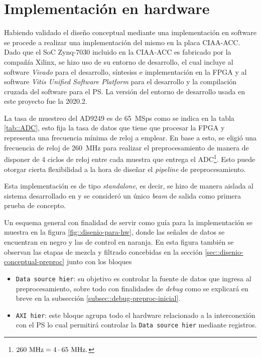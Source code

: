 \documentclass[../../main.tex]{subfiles}
\begin{document}
\section{Implementación en hardware}
Habiendo validado el diseño conceptual mediante una implementación en software se procede a realizar una implementación del mismo en la placa CIAA-ACC. Dado que el SoC Zynq-7030 incluido en la CIAA-ACC es fabricado por la compañía Xilinx, se hizo uso de su entorno de desarrollo, el cual incluye al software \textit{Vivado} \cite{vivado} para el desarrollo, síntesiss e implementación en la FPGA y al software \textit{Vitis Unified Software Platform} \cite{vitis} para el desarrollo y la compilación cruzada \cite{cross-compilation} del software para el PS. La versión del entorno de desarrollo usada en este proyecto fue la 2020.2.

La tasa de muestreo del AD9249 es de 65~MSps como se indica en la tabla \ref{tab::ADC}, esto fija la tasa de datos que tiene que procesar la FPGA y representa una frecuencia mínima de reloj a emplear. En base a esto, se eligió una frecuencia de reloj de 260~MHz para realizar el preprocesamiento de manera de disponer de 4 ciclos de reloj entre cada muestra que entrega el ADC\footnote{$260~\textrm{MHz} = 4 \cdot 65~\textrm{MHz}.$}. Esto puede otorgar cierta flexibilidad a la hora de diseñar el \textit{pipeline} de preprocesamiento.

Esta implementación es de tipo \textit{standalone}, es decir, se hizo de manera aislada al sistema desarrollado en \cite{proyecto-jose} y se consideró un único \textit{beam} de salida como primera prueba de concepto.

Un esquema general con finalidad de servir como guía para la implementación se muestra en la figura \ref{fig::disenio-para-hw}, donde las señales de datos se encuentran en negro y las de control en naranja. En esta figura también se observan las etapas de mezcla y filtrado concebidas en la sección \ref{sec::disenio-conceptual-preproc} junto con los bloques
\begin{itemize}
    \item \texttt{Data source hier}: su objetivo es controlar la fuente de datos que ingresa al preprocesamiento, sobre todo con finalidades de \textit{debug} como se explicará en breve en la subsección \ref{subsec::debug-preproc-inicial}.
    \item \texttt{AXI hier}: este bloque agrupa todo el hardware relacionado a la interconexión con el PS lo cual permitirá controlar la \texttt{Data source hier} mediante registros.
\end{itemize}
\end{document}
